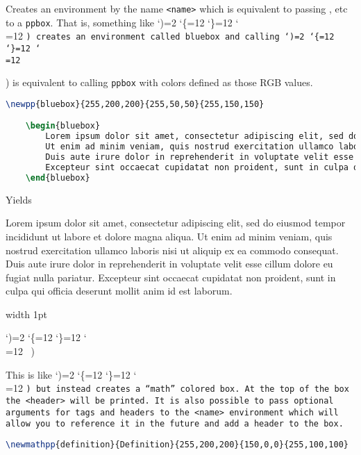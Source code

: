 \documentclass[10pt]{article}
\def\showcase{\medskip\bgroup \color{showcasecolor} \leavevmode\vrule width 1pt \strut \aftergroup\medskip \catcode`)=2 \catcode`\{=12 \catcode`\}=12 \catcode`\\=12 \bftt\ \let\next=}
\def\macrocalls{\bgroup \color{showcasecolor} \catcode`)=2 \catcode`\{=12 \catcode`\}=12 \catcode`\\=12 \tt \let\next=}
\begin{document}
Creates an environment by the name {\tt <name>} which is equivalent to passing {\tt <bg color>}, etc to a {\tt ppbox}.
That is, something like \macrocalls() creates an environment called {\tt bluebox}
and calling \macrocalls(\begin{bluebox}) is equivalent to calling {\tt ppbox} with colors defined as those RGB values.

\begin{lstlisting}[language=tex]
	\newpp{bluebox}{255,200,200}{255,50,50}{255,150,150}

	\begin{bluebox}
		Lorem ipsum dolor sit amet, consectetur adipiscing elit, sed do eiusmod tempor incididunt ut labore et dolore magna aliqua.
		Ut enim ad minim veniam, quis nostrud exercitation ullamco laboris nisi ut aliquip ex ea commodo consequat.
		Duis aute irure dolor in reprehenderit in voluptate velit esse cillum dolore eu fugiat nulla pariatur.
		Excepteur sint occaecat cupidatat non proident, sunt in culpa qui officia deserunt mollit anim id est laborum.
	\end{bluebox}
\end{lstlisting}

Yields


\begin{bluebox}
	Lorem ipsum dolor sit amet, consectetur adipiscing elit, sed do eiusmod tempor incididunt ut labore et dolore magna aliqua.
	Ut enim ad minim veniam, quis nostrud exercitation ullamco laboris nisi ut aliquip ex ea commodo consequat.
	Duis aute irure dolor in reprehenderit in voluptate velit esse cillum dolore eu fugiat nulla pariatur.
	Excepteur sint occaecat cupidatat non proident, sunt in culpa qui officia deserunt mollit anim id est laborum.
\end{bluebox}

\showcase()

This is like \macrocalls(\newpp) but instead creates a ``math'' colored box.
At the top of the box the {\tt <header>} will be printed.
It is also possible to pass optional arguments for tags and headers to the {\tt <name>} environment which will allow you to 
reference it in the future and add a header to the box.

\begin{lstlisting}[language=tex]
	\newmathpp{definition}{Definition}{255,200,200}{150,0,0}{255,100,100}


\end{lstlisting}
\end{bluebox}
\end{document}
